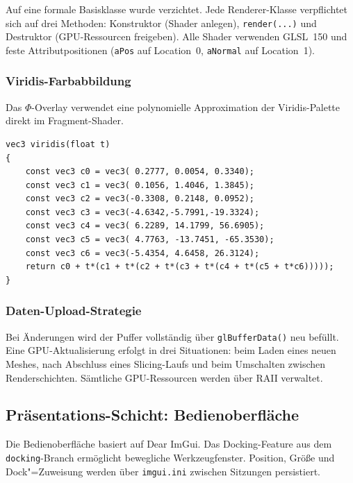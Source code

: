                 Auf eine formale Basisklasse wurde verzichtet.
                Jede Renderer-Klasse verpflichtet sich auf drei Methoden: Konstruktor (Shader anlegen), \texttt{render(...)} und Destruktor (\ac{GPU}-Ressourcen freigeben).
                Alle Shader verwenden GLSL~150 und feste Attributpositionen (\texttt{aPos} auf Location~0, \texttt{aNormal} auf Location~1).

            \subsubsection{Viridis-Farbabbildung}\label{subsubsec:impl-medusa-viridis-shader}
                Das $\Phi$-Overlay verwendet eine polynomielle Approximation der Viridis-Palette direkt im Fragment-Shader.

                \begin{lstlisting}[style=glslStyle, caption={Viridis-Farbabbildung als polynomielle Approximation.}, label={lst:impl-medusa-viridis-frag}]
vec3 viridis(float t)
{
    const vec3 c0 = vec3( 0.2777, 0.0054, 0.3340);
    const vec3 c1 = vec3( 0.1056, 1.4046, 1.3845);
    const vec3 c2 = vec3(-0.3308, 0.2148, 0.0952);
    const vec3 c3 = vec3(-4.6342,-5.7991,-19.3324);
    const vec3 c4 = vec3( 6.2289, 14.1799, 56.6905);
    const vec3 c5 = vec3( 4.7763, -13.7451, -65.3530);
    const vec3 c6 = vec3(-5.4354, 4.6458, 26.3124);
    return c0 + t*(c1 + t*(c2 + t*(c3 + t*(c4 + t*(c5 + t*c6)))));
}
                \end{lstlisting}


            \subsubsection{Daten-Upload-Strategie}\label{subsubsec:impl-medusa-buffer-updates}
                Bei Änderungen wird der Puffer vollständig über \texttt{glBufferData()} neu befüllt.
                Eine \ac{GPU}-Aktualisierung erfolgt in drei Situationen: beim Laden eines neuen Meshes, nach Abschluss eines Slicing-Laufs und beim Umschalten zwischen Renderschichten.
                Sämtliche \ac{GPU}-Ressourcen werden über \ac{RAII} verwaltet.

        \subsection{Präsentations-Schicht: Bedienoberfläche}\label{subsec:impl-medusa-ui}
            Die Bedienoberfläche basiert auf Dear ImGui.
            Das Docking-Feature aus dem \texttt{docking}-Branch ermöglicht bewegliche Werkzeugfenster.
            Position, Größe und Dock"=Zuweisung werden über \texttt{imgui.ini} zwischen Sitzungen persistiert.

